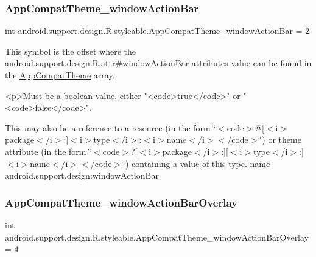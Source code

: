 \subsubsection{\texorpdfstring{App\+Compat\+Theme\+\_\+window\+Action\+Bar}{AppCompatTheme\_windowActionBar}}
{\footnotesize\ttfamily int android.\+support.\+design.\+R.\+styleable.\+App\+Compat\+Theme\+\_\+window\+Action\+Bar = 2\hspace{0.3cm}{\ttfamily [static]}}

This symbol is the offset where the \hyperlink{classandroid_1_1support_1_1design_1_1R_1_1attr_ad115fed13b20f5c7c7be738211784448}{android.\+support.\+design.\+R.\+attr\#window\+Action\+Bar} attribute\textquotesingle{}s value can be found in the \hyperlink{classandroid_1_1support_1_1design_1_1R_1_1styleable_afb351dc8de20cbd4c89abe360373010c}{App\+Compat\+Theme} array.

\begin{DoxyVerb}      <p>Must be a boolean value, either "<code>true</code>" or "<code>false</code>".
\end{DoxyVerb}
 

This may also be a reference to a resource (in the form \char`\"{}$<$code$>$@\mbox{[}$<$i$>$package$<$/i$>$\+:\mbox{]}$<$i$>$type$<$/i$>$\+:$<$i$>$name$<$/i$>$$<$/code$>$\char`\"{}) or theme attribute (in the form \char`\"{}$<$code$>$?\mbox{[}$<$i$>$package$<$/i$>$\+:\mbox{]}\mbox{[}$<$i$>$type$<$/i$>$\+:\mbox{]}$<$i$>$name$<$/i$>$$<$/code$>$\char`\"{}) containing a value of this type.  name android.\+support.\+design\+:window\+Action\+Bar \mbox{\label{classandroid_1_1support_1_1design_1_1R_1_1styleable_a8ea8126eeb9bb872aeb7fdb94d4a4db9}} 
\subsubsection{\texorpdfstring{App\+Compat\+Theme\+\_\+window\+Action\+Bar\+Overlay}{AppCompatTheme\_windowActionBarOverlay}}
{\footnotesize\ttfamily int android.\+support.\+design.\+R.\+styleable.\+App\+Compat\+Theme\+\_\+window\+Action\+Bar\+Overlay = 4\hspace{0.3cm}{\ttfamily [static]}}

